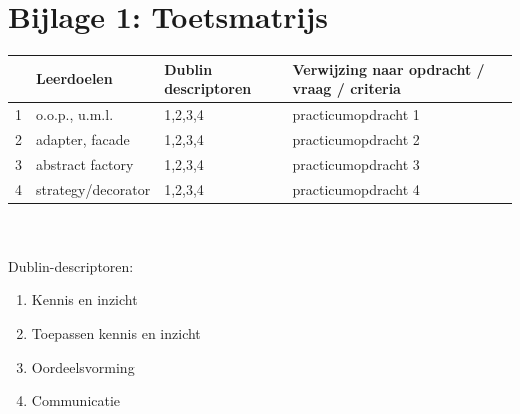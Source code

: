 \documentclass[titlepage,a4paper, 11pt]{article}
\begin{document}
\section{Bijlage 1: Toetsmatrijs}
\begin{tabular}{|p{1cm}|p{4cm}|p{4cm}|p{4cm}|}
\hline
&Leerdoelen&Dublin descriptoren&Verwijzing naar opdracht / vraag / criteria\\
\hline
1&o.o.p., u.m.l.&1,2,3,4&practicumopdracht 1 \\
\hline
2&adapter, facade&1,2,3,4&practicumopdracht 2 \\
\hline
3&abstract factory&1,2,3,4&practicumopdracht 3\\
\hline
4&strategy/decorator&1,2,3,4&practicumopdracht 4\\
\hline
\end{tabular}\\
\vspace{1cm}\\
Dublin-descriptoren:
\begin{enumerate}
\item Kennis en inzicht
\item Toepassen kennis en inzicht
\item Oordeelsvorming
\item Communicatie
\end{enumerate}
\newpage
\end{document}
